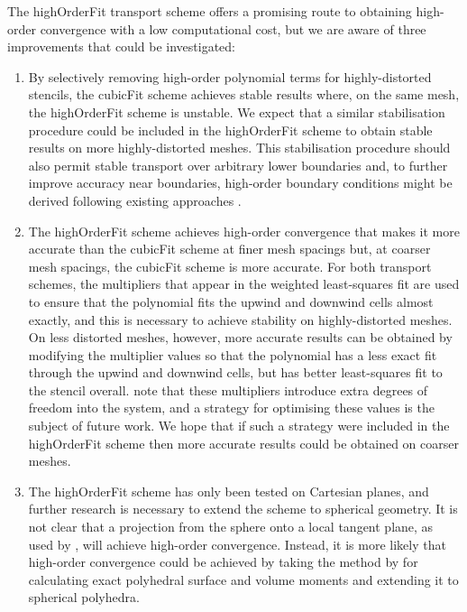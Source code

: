 The highOrderFit transport scheme offers a promising route to obtaining high-order convergence with a low computational cost, but we are aware of three improvements that could be investigated:
\begin{enumerate}
\item By selectively removing high-order polynomial terms for highly-distorted stencils, the cubicFit scheme achieves stable results where, on the same mesh, the highOrderFit scheme is unstable.
We expect that a similar stabilisation procedure could be included in the highOrderFit scheme to obtain stable results on more highly-distorted meshes.
This stabilisation procedure should also permit stable transport over arbitrary lower boundaries and, to further improve accuracy near boundaries, high-order boundary conditions might be derived following existing approaches \citep{devendran2017,schwartz2015}.
%
\item The highOrderFit scheme achieves high-order convergence that makes it more accurate than the cubicFit scheme at finer mesh spacings but, at coarser mesh spacings, the cubicFit scheme is more accurate.
For both transport schemes, the multipliers that appear in the weighted least-squares fit are used to ensure that the polynomial fits the upwind and downwind cells almost exactly, and this is necessary to achieve stability on highly-distorted meshes.
On less distorted meshes, however, more accurate results can be obtained by modifying the multiplier values so that the polynomial has a less exact fit through the upwind and downwind cells, but has better least-squares fit to the stencil overall.
\citet{devendran2017} note that these multipliers introduce extra degrees of freedom into the system, and a strategy for optimising these values is the subject of future work.
We hope that if such a strategy were included in the highOrderFit scheme then more accurate results could be obtained on coarser meshes.
%
\item The highOrderFit scheme has only been tested on Cartesian planes, and further research is necessary to extend the scheme to spherical geometry.
It is not clear that a projection from the sphere onto a local tangent plane, as used by \citet{sjoegreen2012}, will achieve high-order convergence.
Instead, it is more likely that high-order convergence could be achieved by taking the method by \citet{tuzikov2003} for calculating exact polyhedral surface and volume moments and extending it to spherical polyhedra.
\end{enumerate}

